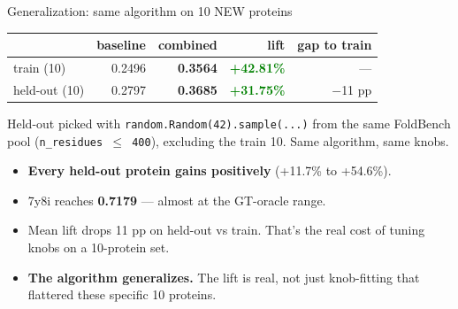 \documentclass[aspectratio=169,11pt]{beamer}
\newcommand{\codeS}[1]{\texttt{\scriptsize\color{navy}#1}}
\begin{document}
\begin{frame}{Generalization: same algorithm on 10 NEW proteins}
  \begin{center}
    \begin{tabular}{lrrrr}
      \toprule
       & baseline & combined & lift & gap to train \\
      \midrule
      train (10)    & 0.2496 & \textbf{0.3564} & \textcolor{green}{\textbf{+42.81\%}} & --- \\
      held-out (10) & 0.2797 & \textbf{0.3685} & \textcolor{green}{\textbf{+31.75\%}} & $-$11 pp \\
      \bottomrule
    \end{tabular}
  \end{center}
  \vspace{0.5em}
  Held-out picked with \codeS{random.Random(42).sample(...)} from the
  same FoldBench pool (\codeS{n\_residues $\leq$ 400}), excluding the
  train 10. Same algorithm, same knobs.
  \vspace{0.6em}
  \begin{itemize}
    \setlength\itemsep{0.2em}
    \item \textbf{Every held-out protein gains positively}
          (+11.7\% to +54.6\%).
    \item 7y8i reaches \textbf{0.7179} — almost at the GT-oracle range.
    \item Mean lift drops 11 pp on held-out vs train. That's the
          real cost of tuning knobs on a 10-protein set.
    \item \textbf{The algorithm generalizes.} The lift is real, not just
          knob-fitting that flattered these specific 10 proteins.
  \end{itemize}
\end{frame}
\end{document}
